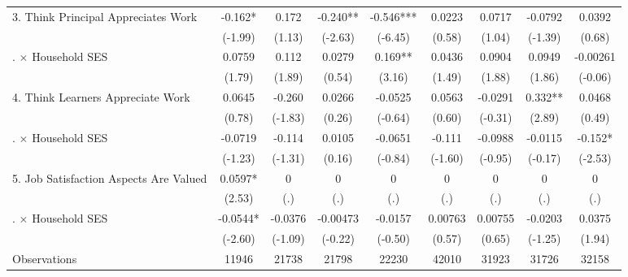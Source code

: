 \documentclass[12pt,preprint, authoryear]{article}
\numberwithin{equation}{section}
\numberwithin{figure}{section}
\numberwithin{table}{section}
\begin{document}
\begin{longtable}[htbp] {p{5cm}*{4}{c}|*{4}{c}}
3. Think Principal Appreciates Work&   -0.162*  &    0.172         &   -0.240** &   -0.546***&   0.0223         &   0.0717         &  -0.0792         &   0.0392         \\
                &  (-1.99)         &   (1.13)         &  (-2.63)         &  (-6.45)         &   (0.58)         &   (1.04)         &  (-1.39)         &   (0.68)         \\
\quad 3. $\times$ Household SES&   0.0759         &    0.112         &   0.0279         &    0.169** &   0.0436         &   0.0904         &   0.0949         & -0.00261         \\
                &   (1.79)         &   (1.89)         &   (0.54)         &   (3.16)         &   (1.49)         &   (1.88)         &   (1.86)         &  (-0.06)         \\
4. Think Learners Appreciate Work&   0.0645         &   -0.260         &   0.0266         &  -0.0525         &   0.0563         &  -0.0291         &    0.332** &   0.0468         \\
                &   (0.78)         &  (-1.83)         &   (0.26)         &  (-0.64)         &   (0.60)         &  (-0.31)         &   (2.89)         &   (0.49)         \\
\quad 4. $\times$ Household SES&  -0.0719         &   -0.114         &   0.0105         &  -0.0651         &   -0.111         &  -0.0988         &  -0.0115         &   -0.152*  \\
                &  (-1.23)         &  (-1.31)         &   (0.16)         &  (-0.84)         &  (-1.60)         &  (-0.95)         &  (-0.17)         &  (-2.53)         \\
5. Job Satisfaction Aspects Are Valued&   0.0597*  &        0         &        0         &        0         &        0         &        0         &        0         &        0         \\
                &   (2.53)         &      (.)         &      (.)         &      (.)         &      (.)         &      (.)         &      (.)         &      (.)         \\
\quad 5. $\times$ Household SES&  -0.0544*  &  -0.0376         & -0.00473         &  -0.0157         &  0.00763         &  0.00755         &  -0.0203         &   0.0375         \\
                &  (-2.60)         &  (-1.09)         &  (-0.22)         &  (-0.50)         &   (0.57)         &   (0.65)         &  (-1.25)         &   (1.94)         \\
\hline
Observations    &    11946         &    21738         &    21798         &    22230         &    42010         &    31923         &    31726         &    32158         \\

\end{longtable}
\end{document}
